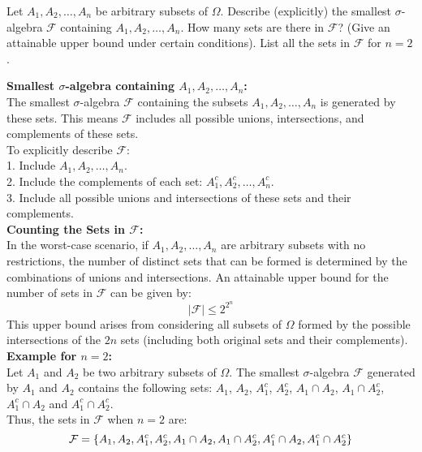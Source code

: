 \begin{exercise}
    Let \( A_1, A_2, \ldots, A_n \) be arbitrary subsets of \( \Omega \). Describe (explicitly) the smallest \(\sigma\)-algebra \( \mathcal{F} \) containing \( A_1, A_2, \ldots, A_n \). How many sets are there in \( \mathcal{F} \)? (Give an attainable upper bound under certain conditions). List all the sets in \( \mathcal{F} \) for \( n = 2 \).
\end{exercise}

\begin{solution}
    \textbf{Smallest \(\sigma\)-algebra containing \( A_1, A_2, \ldots, A_n \):}  \\

    The smallest \(\sigma\)-algebra \( \mathcal{F} \) containing the subsets \( A_1, A_2, \ldots, A_n \) is generated by these sets. This means \( \mathcal{F} \) includes all possible unions, intersections, and complements of these sets.\\
    
    To explicitly describe \( \mathcal{F} \):\\
    1. Include \( A_1, A_2, \ldots, A_n \).\\
    2. Include the complements of each set: \( A_1^c, A_2^c, \ldots, A_n^c \).\\
    3. Include all possible unions and intersections of these sets and their complements.\\
    
    \textbf{Counting the Sets in \( \mathcal{F} \):}  \\
    
    In the worst-case scenario, if \( A_1, A_2, \ldots, A_n \) are arbitrary subsets with no restrictions, the number of distinct sets that can be formed is determined by the combinations of unions and intersections. An attainable upper bound for the number of sets in \( \mathcal{F} \) can be given by:
    \[
    |\mathcal{F}| \leq 2^{2^n}
    \]
    This upper bound arises from considering all subsets of \( \Omega \) formed by the possible intersections of the \( 2n \) sets (including both original sets and their complements).\\
    
    \textbf{Example for \( n = 2 \):} \\
    
    Let \( A_1 \) and \( A_2 \) be two arbitrary subsets of \( \Omega \). The smallest \(\sigma\)-algebra \( \mathcal{F} \) generated by \( A_1 \) and \( A_2 \) contains the following sets: \( A_1 \), \( A_2 \), \( A_1^c \), \( A_2^c \), \( A_1 \cap A_2 \), \( A_1 \cap A_2^c \), \( A_1^c \cap A_2 \) and \( A_1^c \cap A_2^c \).\\
    
    Thus, the sets in \( \mathcal{F} \) when \( n = 2 \) are:
    \[
    \mathcal{F} = \{ A_1, A_2, A_1^c, A_2^c, A_1 \cap A_2, A_1 \cap A_2^c, A_1^c \cap A_2, A_1^c \cap A_2^c \}\\
    \]
\end{solution}

